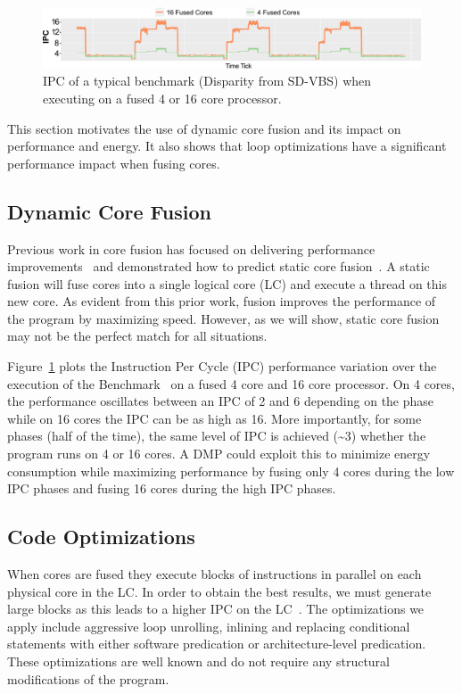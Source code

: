\begin{figure}[t]
    \centering
    \includegraphics[width=\textwidth]{cases-paper/graphics/motivation/disp_opt_4_16_3.pdf}
\vspace*{-5mm}
    \caption{IPC of a typical benchmark (Disparity from SD-VBS) when executing on a fused 4 or 16 core processor.} 
    \label{fig:disp_ex}
\end{figure}

This section motivates the use of dynamic core fusion and its impact on performance and energy.
It also shows that loop optimizations have a significant performance impact when fusing cores.

\subsection{Dynamic Core Fusion}
Previous work in core fusion has focused on delivering performance improvements~\cite{ipek2007CoreFusion,kim2007tflex} and demonstrated how to predict static core fusion~\cite{micolet2016dmpstream}.
A static fusion will fuse cores into a single logical core (LC) and execute a thread on this new core.
As evident from this prior work, fusion improves the performance of the program by maximizing speed.
However, as we will show, static core fusion may not be the perfect match for all situations.

Figure~\ref{fig:disp_ex} plots the Instruction Per Cycle (IPC) performance variation over the execution of the  Benchmark~\cite{sdvbs} on a fused 4 core and 16 core processor.
On 4 cores, the performance oscillates between an IPC of 2 and 6 depending on the phase while on 16 cores the IPC can be as high as 16.
More importantly, for some phases (half of the time), the same level of IPC is achieved (\textasciitilde3) whether the program runs on 4 or 16 cores.
A DMP could exploit this to minimize energy consumption while maximizing performance by fusing only 4 cores during the low IPC phases and fusing 16 cores during the high IPC phases.

\subsection{Code Optimizations}
When cores are fused they execute blocks of instructions in parallel on each physical core in the LC.
In order to obtain the best results, we must generate large blocks as this leads to a higher IPC on the LC~\cite{micolet2016dmpstream}.
The optimizations we apply include aggressive loop unrolling, inlining and replacing conditional statements with either software predication or architecture-level predication.
These optimizations are well known and do not require any structural modifications of the program.

